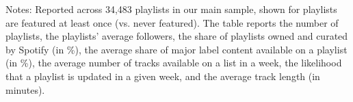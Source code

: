 \begin{table}[t!]
\caption{Characteristics of featured and non-featured playlists.\label{tab:promoplaylist}}
\smallskip{}
\raggedright{}
\begin{flushleft}
\vspace{-0.1cm}
\footnotesize{Notes: Reported across 34,483 playlists in our main sample, shown for playlists are featured at least once (vs. never featured). The table reports the number of playlists, the playlists' average followers, the share of playlists owned and curated by Spotify (in \%), the average share of major label content available on a playlist (in \%), the average number of tracks available on a list in a week, the likelihood that a playlist is updated in a given week, and the average track length (in minutes).}
\end{flushleft}
\end{table}